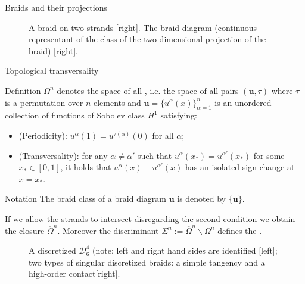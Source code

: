 \documentclass[9pt, english]{beamer}
\theoremstyle{definition}
\newcommand{\simbolovettore}[1]{{\boldsymbol{#1}}}
\newcommand{\vu}{\simbolovettore{u}}
\begin{document}
\begin{frame}{Braids and their projections}
\begin{figure}\label{fig:braiddiagram}
        \caption{A braid on two strands [right]. The braid diagram (continuous
         representant of the class of the two dimensional projection of the braid) [right].}
        \end{figure}
\end{frame}
\begin{frame}{Topological transversality}
        \begin{block}{Definition}
            $\Omega^n$ denotes the space of all
            {\color{blue}{closed positive braid diagrams on $n$ strands pairwise
            transversal}\/}, i.e. the space of all pairs $(\vu, \tau)$ where $\tau$ is a permutation
            over $n$ elements and $\vu=\{u^\alpha(x)\}_{\alpha=1}^n$ is an unordered collection of functions of
            Sobolev class $H^1$ satisfying:
            \begin{itemize}
            \item (Periodicity): $u^\alpha(1)= u^{\tau(\alpha)}(0)$ for
            all $\alpha$;\pause
            \item (Transversality): for any $\alpha \neq \alpha'$ such
            that $u^\alpha(x_*) = u^{\alpha'}(x_*)$ for some $x_* \in
            [0,1]$, it holds that $u^\alpha(x)- u^{\alpha'}(x)$ has an
            isolated sign change at $x=x_*$.
            \end{itemize}
         \end{block}
\end{frame}
\begin{frame}
    \begin{block}{Notation}
            The braid class of a braid diagram $\vu$ is denoted by
            $\{\vu\}$.\pause

            If we allow the strands to intersect disregarding the
            second condition we obtain the closure
            $\overline \Omega^n$. Moreover the discriminant $\Sigma^n:= \overline \Omega^n \backslash \Omega^n$
            defines the {\color{red}{ singular braid diagrams}\/}.\pause
    \end{block}
        \begin{figure}\label{fig:discretized}
            \caption{A discretized $\mathscr D_6^4$ (note: left and right
            hand sides are identified [left]; two types of singular discretized braids: a simple
            tangency and a high-order contact[right].}
        \end{figure}
\end{frame}
\end{document}
